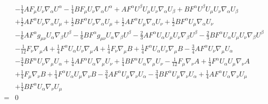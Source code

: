 \documentclass[10pt,letterpaper]{article}
\numberwithin{equation}{section}
\begin{document}
\begin{eqnarray}
&& -  \tfrac{1}{4} A F_{\mu } U_{\nu } \nabla_{\alpha }U^{\alpha } -  \tfrac{1}{4} B F_{\mu } U_{\nu } \nabla_{\alpha }U^{\alpha } + A F^{\alpha } U^{\beta } U_{\mu } U_{\nu } \nabla_{\alpha }U_{\beta } + B F^{\alpha } U^{\beta } U_{\mu } U_{\nu } \nabla_{\alpha }U_{\beta } \nonumber \\ 
&& + \tfrac{1}{2} A F^{\alpha } U_{\nu } \nabla_{\alpha }U_{\mu } + \tfrac{1}{2} B F^{\alpha } U_{\nu } \nabla_{\alpha }U_{\mu } + \tfrac{1}{2} A F^{\alpha } U_{\mu } \nabla_{\alpha }U_{\nu } + \tfrac{1}{2} B F^{\alpha } U_{\mu } \nabla_{\alpha }U_{\nu } \nonumber \\ 
&& -  \tfrac{1}{6} A F^{\alpha } g_{\mu \nu } U_{\alpha } \nabla_{\beta }U^{\beta } -  \tfrac{1}{6} B F^{\alpha } g_{\mu \nu } U_{\alpha } \nabla_{\beta }U^{\beta } -  \tfrac{2}{3} A F^{\alpha } U_{\alpha } U_{\mu } U_{\nu } \nabla_{\beta }U^{\beta } -  \tfrac{2}{3} B F^{\alpha } U_{\alpha } U_{\mu } U_{\nu } \nabla_{\beta }U^{\beta } \nonumber \\ 
&& -  \tfrac{1}{12} F_{\nu } \nabla_{\mu }A + \tfrac{1}{4} F^{\alpha } U_{\alpha } U_{\nu } \nabla_{\mu }A + \tfrac{1}{4} F_{\nu } \nabla_{\mu }B + \tfrac{1}{4} F^{\alpha } U_{\alpha } U_{\nu } \nabla_{\mu }B -  \tfrac{3}{4} A F^{\alpha } U_{\nu } \nabla_{\mu }U_{\alpha } \nonumber \\ 
&& -  \tfrac{3}{4} B F^{\alpha } U_{\nu } \nabla_{\mu }U_{\alpha } + \tfrac{1}{4} A F^{\alpha } U_{\alpha } \nabla_{\mu }U_{\nu } + \tfrac{1}{4} B F^{\alpha } U_{\alpha } \nabla_{\mu }U_{\nu } -  \tfrac{1}{12} F_{\mu } \nabla_{\nu }A + \tfrac{1}{4} F^{\alpha } U_{\alpha } U_{\mu } \nabla_{\nu }A \nonumber \\ 
&& + \tfrac{1}{4} F_{\mu } \nabla_{\nu }B + \tfrac{1}{4} F^{\alpha } U_{\alpha } U_{\mu } \nabla_{\nu }B -  \tfrac{3}{4} A F^{\alpha } U_{\mu } \nabla_{\nu }U_{\alpha } -  \tfrac{3}{4} B F^{\alpha } U_{\mu } \nabla_{\nu }U_{\alpha } + \tfrac{1}{4} A F^{\alpha } U_{\alpha } \nabla_{\nu }U_{\mu } \nonumber \\ 
&& + \tfrac{1}{4} B F^{\alpha } U_{\alpha } \nabla_{\nu }U_{\mu }
\nonumber\\
&=&0
\end{eqnarray}
\end{document}
